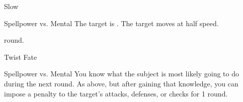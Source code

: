 \begin{spellsection}[Lesser]{Slow}
    \begin{spellheader}
    \end{spellheader}
    \begin{spellcontent}
        \begin{spelltargetinginfo}
        \end{spelltargetinginfo}
        \begin{spelleffects}
            \begin{spellattack}{Spellpower vs. Mental}
                \spellsuccess The target is \slowed.
                \spellfailure The target moves at half speed.
            \end{spellattack}
             round.
        \end{spelleffects}
    \end{spellcontent}
    \begin{spellfooter}
    \end{spellfooter}
\end{spellsection}

\begin{spellsection}{Twist Fate}
    \begin{spellheader}
    \end{spellheader}
    \begin{spellcontent}
        \begin{spelltargetinginfo}
        \end{spelltargetinginfo}
        \begin{spelleffects}
            \begin{spellattack}{Spellpower vs. Mental}
                \spellsuccess You know what the subject is most likely going to do during the next round.
                \spellcritical As above, but after gaining that knowledge, you can impose a  penalty to the target's attacks, defenses, or checks for 1 round.
            \end{spellattack}
        \end{spelleffects}
    \end{spellcontent}
    \begin{spellfooter}
    \end{spellfooter}
\end{spellsection}
